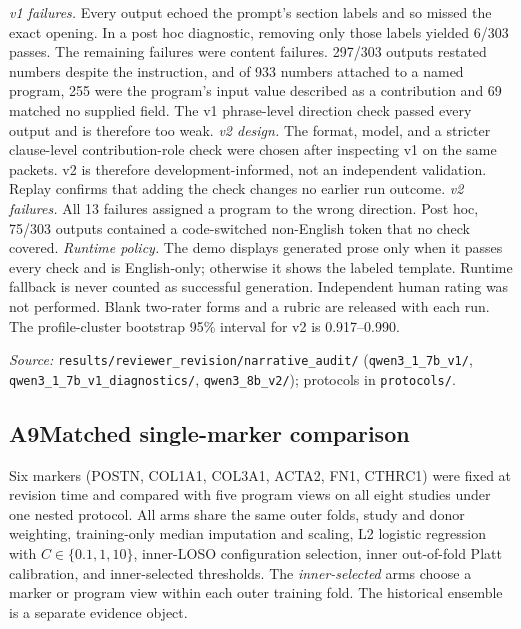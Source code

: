 \smallskip
\emph{v1 failures.} Every output echoed the prompt's section labels and so
missed the exact opening. In a post hoc diagnostic, removing only those labels
yielded 6/303 passes. The remaining failures were content failures. 297/303
outputs restated numbers despite the instruction, and of 933 numbers attached to
a named program, 255 were the program's input value described as a contribution
and 69 matched no supplied field. The v1 phrase-level direction check passed
every output and is therefore too weak.
\emph{v2 design.} The format, model, and a stricter clause-level
contribution-role check were chosen after inspecting v1 on the same packets.
v2 is therefore development-informed, not an independent validation. Replay
confirms that adding the check changes no earlier run outcome.
\emph{v2 failures.} All 13 failures assigned a program to the wrong direction.
Post hoc, 75/303 outputs contained a code-switched non-English token that no
check covered.
\emph{Runtime policy.} The demo displays generated prose only when it passes
every check and is English-only; otherwise it shows the labeled template.
Runtime fallback is never counted as successful generation.
Independent human rating was not performed. Blank two-rater forms and a rubric
are released with each run. The profile-cluster bootstrap 95\% interval for v2
is 0.917--0.990.

\noindent\textit{Source:} \texttt{results/reviewer\_revision/narrative\_audit/}
(\texttt{qwen3\_1\_7b\_v1/}, \texttt{qwen3\_1\_7b\_v1\_diagnostics/},
\texttt{qwen3\_8b\_v2/}); protocols in \texttt{protocols/}.

\subsection*{A9\quad Matched single-marker comparison}
\label{app:markers}

Six markers (POSTN, COL1A1, COL3A1, ACTA2, FN1, CTHRC1) were fixed at revision
time and compared with five program views on all eight studies under one nested
protocol. All arms share the same outer folds, study and donor weighting,
training-only median imputation and scaling, L2 logistic regression with
$C\in\{0.1,1,10\}$, inner-LOSO configuration selection, inner out-of-fold Platt
calibration, and inner-selected thresholds. The \emph{inner-selected} arms
choose a marker or program view within each outer training fold. The
historical ensemble is a separate evidence object.

